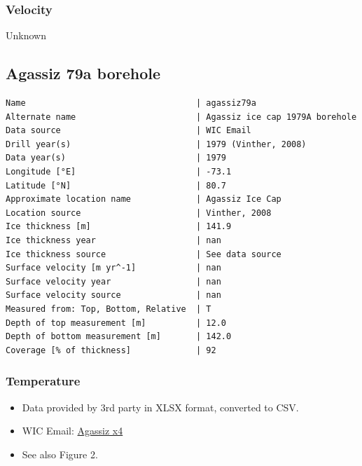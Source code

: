 \documentclass[article,a4paper,times,11pt,twoside]{article}
\begin{document}
\subsubsection{Velocity}
\label{sec:orgbb845b7}

Unknown
\clearpage
\subsection{Agassiz 79a borehole}
\label{sec:orgdcc0900}
\begin{verbatim}
Name                                  | agassiz79a
Alternate name                        | Agassiz ice cap 1979A borehole 
Data source                           | WIC Email 
Drill year(s)                         | 1979 (Vinther, 2008)
Data year(s)                          | 1979 
Longitude [°E]                        | -73.1 
Latitude [°N]                         | 80.7 
Approximate location name             | Agassiz Ice Cap 
Location source                       | Vinther, 2008
Ice thickness [m]                     | 141.9 
Ice thickness year                    | nan 
Ice thickness source                  | See data source 
Surface velocity [m yr^-1]            | nan 
Surface velocity year                 | nan 
Surface velocity source               | nan 
Measured from: Top, Bottom, Relative  | T 
Depth of top measurement [m]          | 12.0 
Depth of bottom measurement [m]       | 142.0 
Coverage [% of thickness]             | 92 
\end{verbatim}


\subsubsection{Temperature}
\label{sec:orgf6d748c}

\begin{itemize}
\item Data provided by 3rd party in XLSX format, converted to CSV.
\item WIC Email: \href{msgid:AM0PR04MB6129DE88C9253A951702EE06A2F30@AM0PR04MB6129.eurprd04.prod.outlook.com}{Agassiz x4}
\item See also \textcite{clarke_1987_wind} Figure 2.
\end{itemize}
\end{document}
